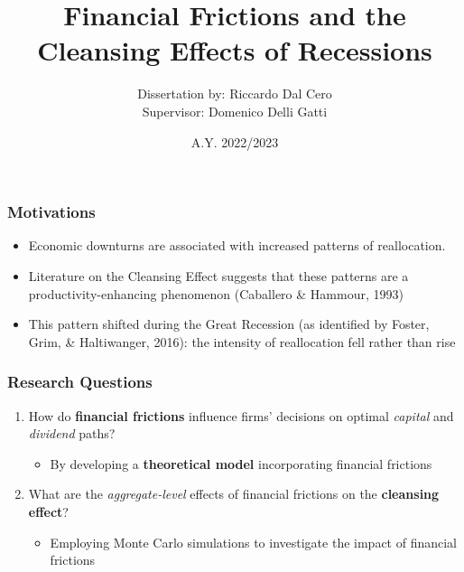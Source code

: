 \documentclass{beamer}
\title[Financial Frictions \& Cleansing Effects]{Financial Frictions and the Cleansing Effects of Recessions}
\author[Riccardo Dal Cero]{Dissertation by: Riccardo Dal Cero \\{\small Supervisor: Domenico Delli Gatti} }
\date[09/04/24]{ A.Y. 2022/2023}
\institute{Università Cattolica del Sacro Cuore \\ Campus of Milan}
\begin{document}
\frame{\titlepage}

\begin{frame}
    \frametitle{Motivations}
    \begin{itemize}
        \item Economic downturns are associated with increased patterns of reallocation.
        \item Literature on the Cleansing Effect suggests that these patterns are a productivity-enhancing phenomenon (Caballero \&
        Hammour, 1993)
        \item This pattern shifted during the Great Recession (as identified by Foster, Grim, \& Haltiwanger,
        2016): the intensity of reallocation 
        fell rather than rise
    \end{itemize}
\end{frame}


\begin{frame}
    \frametitle{Research Questions}
    \begin{enumerate}
        \item How do \textbf{financial frictions} influence firms' decisions on optimal \textit{capital} and \textit{dividend} paths?
        \begin{itemize}
            \item By developing a \textbf{theoretical model} incorporating financial frictions
        \end{itemize}
        \item What are the \textit{aggregate-level} effects of financial frictions on the \textbf{cleansing effect}?
        \begin{itemize}
            \item Employing Monte Carlo simulations to investigate the impact of financial frictions
        \end{itemize}
    \end{enumerate}
\end{frame}
\end{document}
